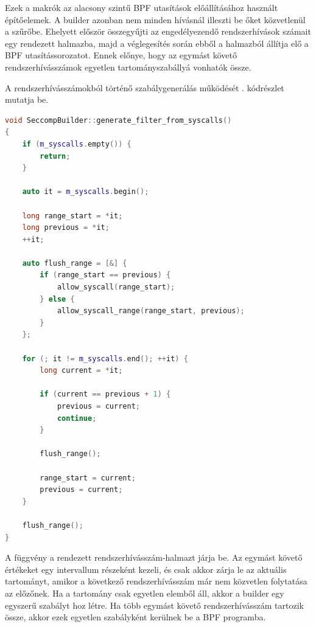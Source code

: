 Ezek a makrók az alacsony szintű BPF utasítások előállításához használt
építőelemek. A builder azonban nem minden  hívásnál illeszti be
őket közvetlenül a szűrőbe. Ehelyett először összegyűjti az engedélyezendő
rendszerhívások számait egy rendezett halmazba, majd a véglegesítés során ebből
a halmazból állítja elő a BPF utasítássorozatot. Ennek előnye, hogy az egymást
követő rendszerhívásszámok egyetlen tartományszabállyá vonhatók össze.

A rendszerhívásszámokból történő szabálygenerálás működését
. kódrészlet mutatja be.

\begin{lstlisting}[float, language=C++, caption={BPF szabályok generálása rendszerhívásszámokból}, label={lst:seccomp-generate-filter}]
void SeccompBuilder::generate_filter_from_syscalls()
{
    if (m_syscalls.empty()) {
        return;
    }

    auto it = m_syscalls.begin();

    long range_start = *it;
    long previous = *it;
    ++it;

    auto flush_range = [&] {
        if (range_start == previous) {
            allow_syscall(range_start);
        } else {
            allow_syscall_range(range_start, previous);
        }
    };

    for (; it != m_syscalls.end(); ++it) {
        long current = *it;

        if (current == previous + 1) {
            previous = current;
            continue;
        }

        flush_range();

        range_start = current;
        previous = current;
    }

    flush_range();
}
\end{lstlisting}

A  függvény a rendezett
rendszerhívásszám-halmazt járja be. Az egymást követő értékeket egy intervallum
részeként kezeli, és csak akkor zárja le az aktuális tartományt, amikor a
következő rendszerhívásszám már nem közvetlen folytatása az előzőnek. Ha a
tartomány csak egyetlen elemből áll, akkor a builder egy egyszerű
 szabályt hoz létre. Ha több egymást követő
rendszerhívásszám tartozik össze, akkor ezek egyetlen
 szabályként kerülnek be a BPF
programba.

